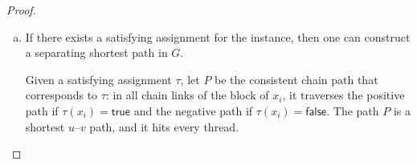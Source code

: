 \begin{proof}
\begin{enumerate}[(a)]
    Since $P$ is a shortest $u$--$v$ path, it is a chain path, and since it is separating, it hits every thread.
    By the synchronization property, $P$ is consistent, so it determines a truth assignment $\tau$.
    Moreover, $P$ hits every clause thread, which means that $\tau$ satisfies at least one literal in every clause.
    Thus, $\tau$ is a satisfying assignment for the original formula.

    \item If there exists a satisfying assignment for the \ThreeSAT{} instance, then one can construct a separating shortest path in $G$.

Given a satisfying assignment $\tau$, let $P$ be the consistent chain path that corresponds to $\tau$: in all chain links of the block of $x_i$, it traverses the positive path if $\tau(x_i)=\mathsf{true}$ and the negative path if $\tau(x_i)=\mathsf{false}$.
The path $P$ is a shortest $u$--$v$ path, and it hits every thread.


\end{enumerate}
\end{proof}
